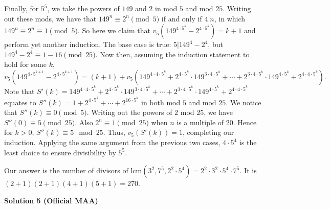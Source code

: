 \begin{enumerate}
 Finally, for $5^5$, we take the powers of $149$ and $2$ in mod $5$ and mod $25$. Writing out these mods, we have that $149^n \equiv 2^n \pmod{5}$ if and only if $4 | n$, in which $149^n \equiv 2^n \equiv 1 \pmod{5}$. So here we claim that $v_5(149^{4\cdot5^k} - 2^{4\cdot5^k}) = k + 1$ and perform yet another induction. The base case is true: $5 | 149^4 - 2^4$, but $149^4 - 2^4 \equiv 1 - 16 \pmod{25}$. Now then, assuming the induction statement to hold for some $k$, 
 \[v_5(149^{4\cdot5^{k+1}} - 2^{4\cdot5^{k+1}}) = (k+1) + v_5(149^{4\cdot4\cdot5^k}+2^{4\cdot5^k}\cdot149^{3\cdot4\cdot5^k}+\cdots+2^{3\cdot4\cdot5^k}\cdot149^{4\cdot5^k}+2^{4\cdot4\cdot5^k}).\] Note that $S'(k) =  149^{4\cdot4\cdot5^k}+2^{4\cdot5^k}\cdot149^{3\cdot4\cdot5^k}+\cdots+2^{3\cdot4\cdot5^k}\cdot149^{4\cdot5^k}+2^{4\cdot4\cdot5^k}$ equates to $S''(k) = 1 + 2^{4\cdot5^k} + \cdots + 2^{16\cdot5^k}$ in both mod $5$ and mod $25$. We notice that $S''(k) \equiv 0 \pmod{5}$. Writing out the powers of $2$ mod $25$, we have $S''(0) \equiv 5 \pmod{25}$. Also $2^n \equiv 1 \pmod{25}$ when $n$ is a multiple of $20$. Hence for $k > 0$, $S''(k) \equiv 5 \mod{25}$. Thus, $v_5\left(S'(k)\right) = 1$, completing our induction. Applying the same argument from the previous two cases, $4\cdot5^4$ is the least choice to ensure divisibility by $5^5$.

 Our answer is the number of divisors of $\text{lcm}(3^2, 7^5, 2^2\cdot5^4) = 2^2 \cdot 3^2 \cdot 5^4 \cdot 7^5$. It is $(2 + 1)(2 + 1)(4 + 1)(5 + 1) = \boxed{270}$.

 



\textbf{Solution 5 (Official MAA)}


\end{enumerate}
